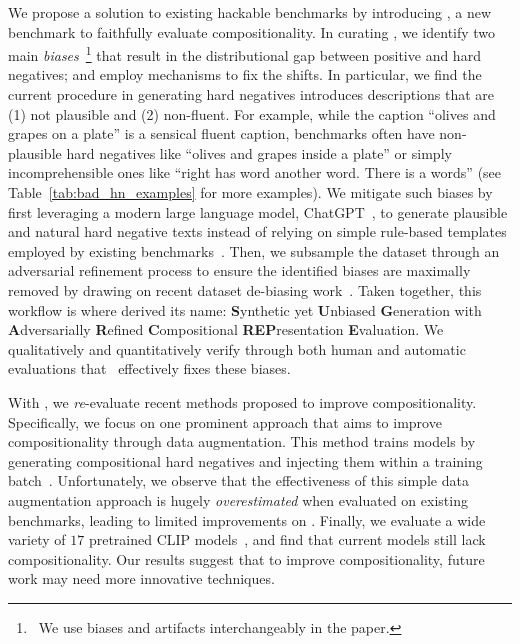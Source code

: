 We propose a solution to existing hackable benchmarks by introducing \method, a new benchmark to faithfully evaluate compositionality. In curating \method, we identify two main \emph{biases}~\footnote{\ We use biases and artifacts interchangeably in the paper.} that result in the distributional gap between positive and hard negatives; and employ mechanisms to fix the shifts.
In particular, we find the current procedure in generating hard negatives introduces descriptions that are (1) not plausible and (2) non-fluent.
For example, while the caption ``olives and grapes on a plate'' is a sensical fluent caption, benchmarks often have non-plausible hard negatives like ``olives and grapes inside a plate'' or simply incomprehensible ones like ``right has word another word. There is a words'' (see Table~\ref{tab:bad_hn_examples} for more examples).
We mitigate such biases by first leveraging a modern large language model, ChatGPT~\cite{chatgpt}, to generate plausible and natural hard negative texts instead of relying on simple rule-based templates employed by existing benchmarks~\cite{ma2022crepe,yuksekgonul2023when}.
Then, we subsample the dataset through an adversarial refinement process to ensure the identified biases are maximally removed by drawing on recent dataset de-biasing work~\cite{zellers2018swag,sakaguchi2021winogrande,le2020adversarial}.
Taken together, this workflow is where \method derived its name: \textbf{S}ynthetic yet \textbf{U}nbiased \textbf{G}eneration with \textbf{A}dversarially \textbf{R}efined \textbf{C}ompositional \textbf{REP}resentation \textbf{E}valuation.
We qualitatively and quantitatively verify through both human and automatic evaluations that \method\ effectively fixes these biases.


With \method, we \emph{re}-evaluate recent methods proposed to improve compositionality. Specifically, we focus on one prominent approach that aims to improve compositionality through data augmentation. This method trains models by generating compositional hard negatives and injecting them within a training batch~\cite{doveh2023teaching,yuksekgonul2023when}.
Unfortunately, we observe that the effectiveness of this simple data augmentation approach is hugely \emph{overestimated} when evaluated on existing benchmarks, leading to limited improvements on \method.
Finally, we evaluate a wide variety of $17$ pretrained CLIP models~\cite{RadfordKHRGASAM21,ilharco_gabriel_2021_5143773,gadre2023datacomp}, and find that current models still lack compositionality.
Our results suggest that to improve compositionality, future work may need more innovative techniques.


